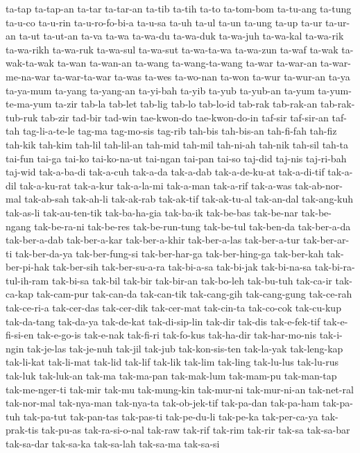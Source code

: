 {ta-tap ta-tap-an ta-tar ta-tar-an ta-tib ta-tih ta-to ta-tom-bom ta-tu-ang
ta-tung ta-u-co ta-u-rin ta-u-ro-fo-bi-a ta-u-sa ta-uh ta-ul ta-un ta-ung
ta-up ta-ur ta-ur-an ta-ut ta-ut-an ta-va ta-wa ta-wa-du ta-wa-duk
ta-wa-juh ta-wa-kal ta-wa-rik ta-wa-rikh ta-wa-ruk ta-wa-sul ta-wa-sut
ta-wa-ta-wa ta-wa-zun ta-waf ta-wak ta-wak-ta-wak ta-wan ta-wan-an ta-wang
ta-wang-ta-wang ta-war ta-war-an ta-war-me-na-war ta-war-ta-war ta-was
ta-wes ta-wo-nan ta-won ta-wur ta-wur-an ta-ya ta-ya-mum ta-yang
ta-yang-an ta-yi-bah ta-yib ta-yub ta-yub-an ta-yum ta-yum-te-ma-yum
ta-zir tab-la tab-let tab-lig tab-lo tab-lo-id tab-rak tab-rak-an
tab-rak-tub-ruk tab-zir tad-bir tad-win tae-kwon-do tae-kwon-do-in taf-sir
taf-sir-an taf-tah tag-li-a-te-le tag-ma tag-mo-sis tag-rib tah-bis
tah-bis-an tah-fi-fah tah-fiz tah-kik tah-kim tah-lil tah-lil-an tah-mid
tah-mil tah-ni-ah tah-nik tah-sil tah-ta tai-fun tai-ga tai-ko
tai-ko-na-ut tai-ngan tai-pan tai-so taj-did taj-nis taj-ri-bah taj-wid
tak-a-ba-di tak-a-cuh tak-a-da tak-a-dab tak-a-de-ku-at tak-a-di-tif
tak-a-dil tak-a-ku-rat tak-a-kur tak-a-la-mi tak-a-man tak-a-rif tak-a-was
tak-ab-nor-mal tak-ab-sah tak-ah-li tak-ak-rab tak-ak-tif tak-ak-tu-al
tak-an-dal tak-ang-kuh tak-as-li tak-au-ten-tik tak-ba-ha-gia tak-ba-ik
tak-be-bas tak-be-nar tak-be-ngang tak-be-ra-ni tak-be-res tak-be-run-tung
tak-be-tul tak-ben-da tak-ber-a-da tak-ber-a-dab tak-ber-a-kar
tak-ber-a-khir tak-ber-a-las tak-ber-a-tur tak-ber-ar-ti tak-ber-da-ya
tak-ber-fung-si tak-ber-har-ga tak-ber-hing-ga tak-ber-kah tak-ber-pi-hak
tak-ber-sih tak-ber-su-a-ra tak-bi-a-sa tak-bi-jak tak-bi-na-sa
tak-bi-ra-tul-ih-ram tak-bi-sa tak-bil tak-bir tak-bir-an tak-bo-leh
tak-bu-tuh tak-ca-ir tak-ca-kap tak-cam-pur tak-can-da tak-can-tik
tak-cang-gih tak-cang-gung tak-ce-rah tak-ce-ri-a tak-cer-das tak-cer-dik
tak-cer-mat tak-cin-ta tak-co-cok tak-cu-kup tak-da-tang tak-da-ya
tak-de-kat tak-di-sip-lin tak-dir tak-dis tak-e-fek-tif tak-e-fi-si-en
tak-e-go-is tak-e-nak tak-fi-ri tak-fo-kus tak-ha-dir tak-har-mo-nis
tak-i-ngin tak-je-las tak-je-nuh tak-jil tak-jub tak-kon-sis-ten
tak-la-yak tak-leng-kap tak-li-kat tak-li-mat tak-lid tak-lif tak-lik
tak-lim tak-ling tak-lu-lus tak-lu-rus tak-luk tak-luk-an tak-ma
tak-ma-pan tak-mak-lum tak-mam-pu tak-man-tap tak-me-nger-ti tak-mir
tak-mu tak-mung-kin tak-mur-ni tak-mur-ni-an tak-net-ral tak-nor-mal
tak-nya-man tak-nya-ta tak-ob-jek-tif tak-pa-dan tak-pa-ham tak-pa-tuh
tak-pa-tut tak-pan-tas tak-pas-ti tak-pe-du-li tak-pe-ka tak-per-ca-ya
tak-prak-tis tak-pu-as tak-ra-si-o-nal tak-raw tak-rif tak-rim tak-rir
tak-sa tak-sa-bar tak-sa-dar tak-sa-ka tak-sa-lah tak-sa-ma tak-sa-si
}
